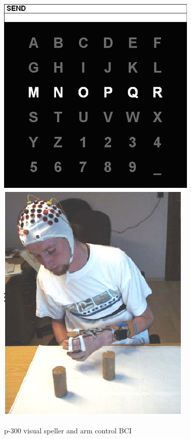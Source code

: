 \documentclass[12pt]{article}
\begin{document}
 \begin{figure}[h]
 	\caption{p-300 visual speller and arm control BCI}
 	\includegraphics[scale=0.5]{VisualSpeller.png}
 	\includegraphics[scale=0.5]{InducedBCI.png}
 \end{figure}
\end{document}
